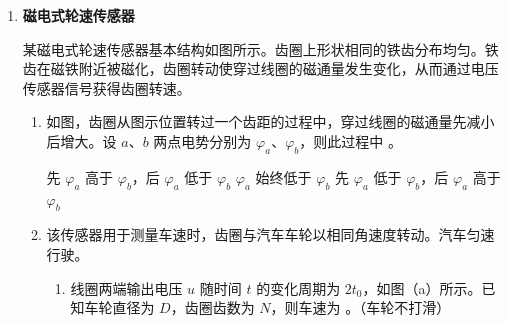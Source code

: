 \documentclass[\gkver]{gaokaozhenti}
\begin{document}
\begin{enumerate}
{联立解得作用力大小为

\[F=m\sqrt{a^{2}+g^{2}+2ag\sin60^{\circ}}=0.3\times\sqrt{1.0^{2}+9.8^{2}+2\times1.0\times9.8\times\frac{\sqrt{3}}{2}} \UN=3.2 \UN\]

\onepicture[h=3.12cm]{}

3．（1）由图可知松鼠下落 $10 \Um$ 时的速度为 $9 \Ums$，由动能定理可得：

\[mgh+W_{f}=\frac{1}{2}mv^{2}-0\]

解得 $W_{f}=\frac{1}{2}mv^{2}-mgh=(0.5\times0.3\times9^{2}-0.3\times9.8\times10) \UJ=-17.25 \UJ$。

（2）取向上为正方向，由动量定理有 $(F-mg)t=0-(-mv)$，

得 $F=mg+\frac{mv}{t}=9.8m+m\frac{9}{90\times10^{-3}}=109.8m<15mg=147m$。

松鼠可以安全落地。
}

\item
\textbf{磁电式轮速传感器}

某磁电式轮速传感器基本结构如图所示。齿圈上形状相同的铁齿分布均匀。铁齿在磁铁附近被磁化，齿圈转动使穿过线圈的磁通量发生变化，从而通过电压传感器信号获得齿圈转速。

\onepicture[align=right, w=6.50cm]{}
\begin{enumerate}
	\item
	如图，齿圈从图示位置转过一个齿距的过程中，穿过线圈的磁通量先减小后增大。设 $a$、$b$ 两点电势分别为 $\varphi_{a}$、$\varphi_{b}$，则此过程中 。

	\onepicture[align=right, w=6.50cm]{}

	{先 $\varphi_{a}$ 高于 $\varphi_{b}$，后 $\varphi_{a}$ 低于 $\varphi_{b}$}
	{$\varphi_{a}$ 始终低于 $\varphi_{b}$}
	{先 $\varphi_{a}$ 低于 $\varphi_{b}$，后 $\varphi_{a}$ 高于 $\varphi_{b}$}

	\item
	该传感器用于测量车速时，齿圈与汽车车轮以相同角速度转动。汽车匀速行驶。

	\begin{enumerate}
		\item
		线圈两端输出电压 $u$ 随时间 $t$ 的变化周期为 $2t_{0}$，如图（a）所示。已知车轮直径为 $D$，齿圈齿数为 $N$，则车速为 。（车轮不打滑）


\end{enumerate}
\end{enumerate}
\end{enumerate}
\end{document}
